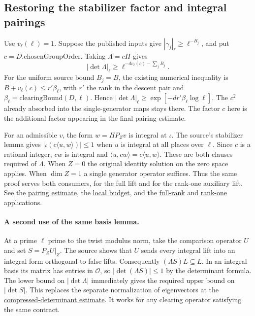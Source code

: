 \documentclass[11pt,letterpaper]{article}
\newcommand{\cO}{\mathcal O}
\newcommand{\src}[3]{\href{https://github.com/VladimirReshetnikov/ProveIt/blob/89d12dd40424f1217fd818d84877b3da52396a3b/Analysis/GeneralizedRiemannHypothesis/Lean/grh/src/#1.lean\#L#2}{#3}}
\newcommand{\db}[2]{\src{New/Congruences/FirstOrder/DenominatorBound}{#1}{#2}}
\newcommand{\lv}[2]{\src{New/OneLift/LiftVolumeHeight}{#1}{#2}}
\begin{document}
\subsection{Restoring the stabilizer factor and integral pairings}
Use $v_\ell(\ell)=1$. Suppose the published inputs give $|\gamma_j|_\ell\ge \ell^{-B_j}$, and put $c=D.\mathrm{chosenGroupOrder}$. Taking $\Lambda=cH$ gives
\[
    |\det\Lambda|_\ell\ge
           \ell^{-d v_\ell(c)-\sum_j B_j}.
\]
For the uniform source bound $B_j=B$, the existing numerical inequality is $B+v_\ell(c)\le r'\beta_\ell$, with $r'$ the rank in the descent pair and $\beta_\ell=\mathrm{clearingBound}(D,\ell)$. Hence $|\det\Lambda|_\ell\ge\exp[-d r'\beta_\ell\log\ell]$. The $c^2$ already absorbed into the single-generator maps stays there. The factor $c$ here is the additional factor appearing in the final pairing estimate.

For an admissible $v$, the form $w=H P_Zv$ is integral at $\iota$. The source's stabilizer lemma gives $|\iota(c\langle u,w\rangle)|\le1$ when $u$ is integral at all places over $\ell$. Since $c$ is a rational integer, $c w$ is integral and $\langle u,cw\rangle=c\langle u,w\rangle$. These are both clauses required of $\Lambda$. When $Z=0$ the original identity solution on the zero space applies. When $\dim Z=1$ a single generator operator suffices. Thus the same proof serves both consumers, for the full lift and for the rank-one auxiliary lift. See the \src{Lib/Adelic/AutomorphicForms/PAdicGauge}{750}{pairing estimate}, the \db{1276}{local budget}, and the \src{New/Congruences/FitTwistsExist}{415}{full-rank} and \src{New/Congruences/FitTwistsExist}{444}{rank-one} applications.

\paragraph{A second use of the same basis lemma.}
At a prime $\ell$ prime to the twist modulus norm, take the comparison operator $U$ and set $S=P_ZU|_Z$. The source shows that $U$ sends every integral lift into an integral form orthogonal to false lifts. Consequently $(\Lambda S)L\subseteq L$. In an integral basis its matrix has entries in $\cO$, so $|\det(\Lambda S)|\le1$ by the determinant formula. The lower bound on $|\det\Lambda|$ immediately gives the required upper bound on $|\det S|$. This replaces the separate normalization of eigenvectors at the \lv{652}{compressed-determinant estimate}. It works for any clearing operator satisfying the same contract.
\end{document}

